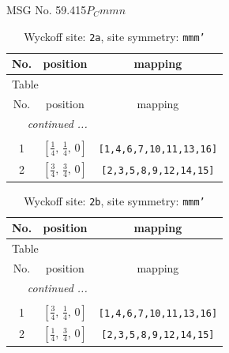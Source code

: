 \documentclass[fleqn,8pt]{jsarticle}
\begin{document}
\setcounter{MaxMatrixCols}{32}

\renewcommand{\tablename}{Table~}
\renewcommand{\figurename}{Figure~}
\begin{center}
\LARGE
MSG No. 59.415\quad$P_{C}mmn$
\end{center}
\renewcommand{\arraystretch}{1.2}
\begin{longtable}{ccc}
\caption{Wyckoff site: {\tt 2a}, site symmetry: {\tt mmm'}}
 \\
 \hline \hline
No. & position & mapping \\ \hline \endfirsthead

\multicolumn{2}{l}{\tablename\ \thetable{}} \\
 \hline \hline
No. & position & mapping \\ \hline \endhead

 \hline \hline
\multicolumn{2}{r}{\footnotesize\it continued ...} \\ \endfoot

 \hline \hline
\multicolumn{2}{r}{} \\ \endlastfoot

1 & $\left[ \frac{1}{4},\, \frac{1}{4},\, 0 \right]$ & {\tt [1,4,6,7,10,11,13,16]} \\ \hline
2 & $\left[ \frac{3}{4},\, \frac{3}{4},\, 0 \right]$ & {\tt [2,3,5,8,9,12,14,15]} \\
\end{longtable}
\renewcommand{\arraystretch}{1.2}
\begin{longtable}{ccc}
\caption{Wyckoff site: {\tt 2b}, site symmetry: {\tt mmm'}}
 \\
 \hline \hline
No. & position & mapping \\ \hline \endfirsthead

\multicolumn{2}{l}{\tablename\ \thetable{}} \\
 \hline \hline
No. & position & mapping \\ \hline \endhead

 \hline \hline
\multicolumn{2}{r}{\footnotesize\it continued ...} \\ \endfoot

 \hline \hline
\multicolumn{2}{r}{} \\ \endlastfoot

1 & $\left[ \frac{3}{4},\, \frac{1}{4},\, 0 \right]$ & {\tt [1,4,6,7,10,11,13,16]} \\ \hline
2 & $\left[ \frac{1}{4},\, \frac{3}{4},\, 0 \right]$ & {\tt [2,3,5,8,9,12,14,15]} \\
\end{longtable}
\end{document}

